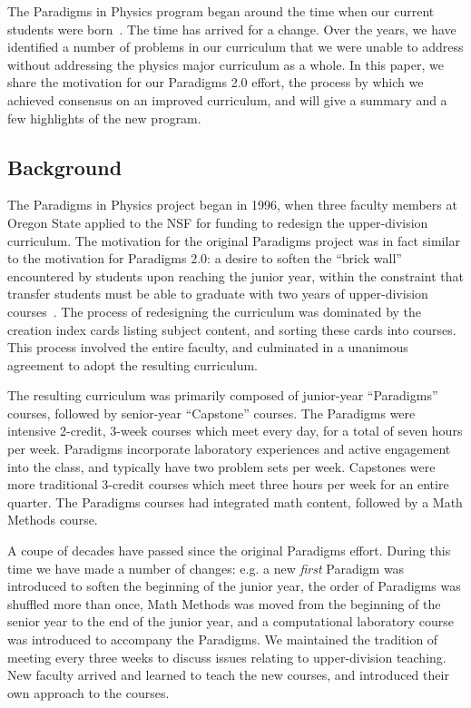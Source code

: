 \documentclass[english,aps,pra,reprint,noshowpacs,superscriptaddress]{revtex4-1}
\begin{document}
The Paradigms in Physics program began around the time when our
current students were born~\cite{manogue2001paradigms}.  The time has
arrived for a change.  Over the years, we have identified a number of
problems in our curriculum that we were unable to address without
addressing the physics major curriculum as a whole.  In this paper, we
share the motivation for our Paradigms 2.0 effort, the process by
which we achieved consensus on an improved curriculum, and will give
a summary and a few highlights of the new program.

\subsection{Background}
The Paradigms in Physics project began in 1996, when three faculty
members at Oregon State applied to the NSF for funding to redesign the
upper-division curriculum.  The motivation for the original Paradigms
project was in fact similar to the motivation for Paradigms 2.0: a
desire to soften the ``brick wall'' encountered by students upon
reaching the junior year, within the constraint that transfer students
must be able to graduate with two years of upper-division
courses~\cite{manogue2001paradigms}.  The process of redesigning the
curriculum was dominated by the creation index cards listing subject
content, and sorting these cards into courses.  This process involved
the entire faculty, and culminated in a unanimous agreement to adopt
the resulting curriculum.

The resulting curriculum was primarily composed of junior-year
``Paradigms'' courses, followed by senior-year ``Capstone'' courses.
The Paradigms were intensive 2-credit, 3-week courses which meet every
day, for a total of seven hours per week.  Paradigms incorporate
laboratory experiences and active engagement into the class, and
typically have two problem sets per week.  Capstones were more
traditional 3-credit courses which meet three hours per week for an
entire quarter.  The Paradigms courses had integrated math content,
followed by a Math Methods course.

A coupe of decades have passed since the original Paradigms effort.
During this time we have made a number of changes: e.g. a new
\emph{first} Paradigm was introduced to soften the beginning of the
junior year, the order of Paradigms was shuffled more than once, Math
Methods was moved from the beginning of the senior year to the end of
the junior year, and a computational laboratory course was introduced
to accompany the Paradigms.  We maintained the tradition of meeting
every three weeks to discuss issues relating to upper-division
teaching.  New faculty arrived and learned to teach the new courses,
and introduced their own approach to the courses.
\end{document}
